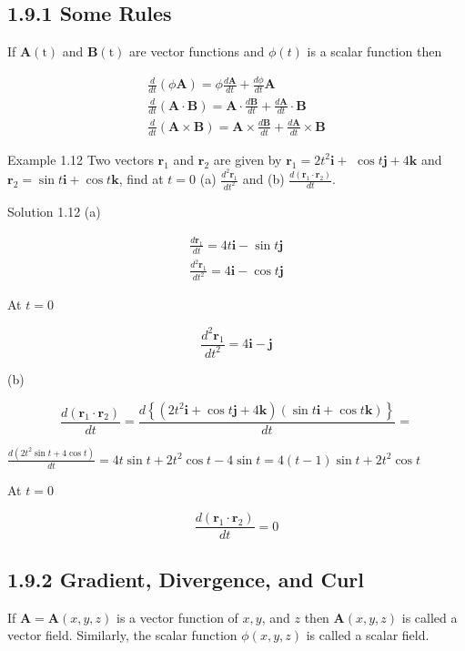 \documentclass[10pt]{article}
\begin{document}
\subsection*{1.9.1 Some Rules}
If $\mathbf{A}(\mathrm{t})$ and $\mathbf{B}(\mathrm{t})$ are vector functions and $\phi(t)$ is a scalar function then

$$
\begin{gathered}
\frac{d}{d t}(\phi \mathbf{A})=\phi \frac{d \mathbf{A}}{d t}+\frac{d \phi}{d t} \mathbf{A} \\
\frac{d}{d t}(\mathbf{A} \cdot \mathbf{B})=\mathbf{A} \cdot \frac{d \mathbf{B}}{d t}+\frac{d \mathbf{A}}{d t} \cdot \mathbf{B} \\
\frac{d}{d t}(\mathbf{A} \times \mathbf{B})=\mathbf{A} \times \frac{d \mathbf{B}}{d t}+\frac{d \mathbf{A}}{d t} \times \mathbf{B}
\end{gathered}
$$

Example 1.12 Two vectors $\mathbf{r}_{1}$ and $\mathbf{r}_{2}$ are given by $\mathbf{r}_{1}=2 t^{2} \mathbf{i}+$ $\cos t \mathbf{j}+4 \mathbf{k}$ and $\mathbf{r}_{2}=\sin t \mathbf{i}+\cos t \mathbf{k}$, find at $t=0$ (a) $\frac{d^{2} \mathbf{r}_{1}}{d t^{2}}$ and (b) $\frac{d\left(\mathbf{r}_{1} \cdot \mathbf{r}_{2}\right)}{d t}$.

Solution 1.12 (a)

$$
\begin{gathered}
\frac{d \mathbf{r}_{1}}{d t}=4 t \mathbf{i}-\sin t \mathbf{j} \\
\frac{d^{2} \mathbf{r}_{1}}{d t^{2}}=4 \mathbf{i}-\cos t \mathbf{j}
\end{gathered}
$$

At $t=0$

$$
\frac{d^{2} \mathbf{r}_{1}}{d t^{2}}=4 \mathbf{i}-\mathbf{j}
$$

(b)

$$
\frac{d\left(\mathbf{r}_{1} \cdot \mathbf{r}_{2}\right)}{d t}=\frac{d\left\{\left(2 t^{2} \mathbf{i}+\cos t \mathbf{j}+4 \mathbf{k}\right)(\sin t \mathbf{i}+\cos t \mathbf{k})\right\}}{d t}=
$$

$\frac{d\left(2 t^{2} \sin t+4 \cos t\right)}{d t}=4 t \sin t+2 t^{2} \cos t-4 \sin t=4(t-1) \sin t+2 t^{2} \cos t$

At $t=0$

$$
\frac{d\left(\mathbf{r}_{1} \cdot \mathbf{r}_{2}\right)}{d t}=0
$$

\subsection*{1.9.2 Gradient, Divergence, and Curl}
If $\mathbf{A}=\mathbf{A}(x, y, z)$ is a vector function of $x, y$, and $z$ then $\mathbf{A}(x, y, z)$ is called a vector field. Similarly, the scalar function $\phi(x, y, z)$ is called a scalar field.
\end{document}
